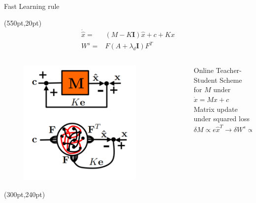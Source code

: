 \documentclass[17pt, t, lualatex]{beamer}
\begin{document}
\begin{frame}{Fast Learning rule}


	\begin{textblock*}{10pt}(550pt,20pt)
		\small
		\begin{equation*}
		\begin{aligned}
		\dot{\hat{x}}=&(M-K \mathbf{I}) \hat{x}+c+K x\\
		W^s =& F\left(A + \lambda_d\mathbf{I}\right)F^T
		\end{aligned}
		\end{equation*}
	\end{textblock*}

	\begin{columns}
		\begin{column}{0.45\textwidth}
			\begin{figure}
				\centering
				\includegraphics[width = 0.8\textwidth,trim= 0cm 0cm 0cm 8cm]{figures/slow_learning_rule.png}
			\end{figure}
			\begin{textblock*}{10pt}(300pt,240pt)
				\small
				\cite{bourdoukan_enforcing_2015}
			\end{textblock*}
		\end{column}
		\begin{column}{0.45\textwidth}
			Online Teacher-Student Scheme for $M$ under $\dot{x} = Mx +c$\\
			Matrix update under squared loss
			\begin{equation}
			\delta M \propto e\hat{x}^T \longrightarrow\delta W^s \propto F^T \left(e\hat{x}^T\right)F \approx F^T er
			\end{equation}
		\end{column}
	\end{columns}
\end{frame}
\end{document}
